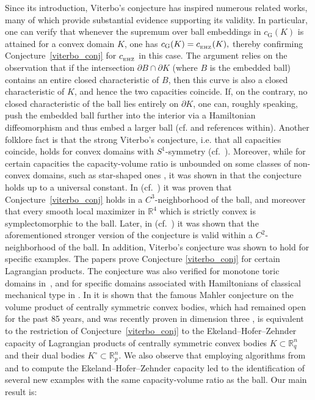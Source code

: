 \documentclass[10pt,a4paper]{article}
\theoremstyle{definition}
\newcommand{\R}{{\mathbb{R}}}
\newcommand{\ehzcap}{c_{_{\rm EHZ}}}
\begin{document}
\medskip 
Since its introduction, Viterbo's conjecture has inspired numerous related works, many of which provide substantial evidence supporting its validity.
In particular, one can verify that whenever the supremum over ball embeddings in $c_{\mathrm{G}}(K)$ is attained for a convex domain $K$, one has  $c_{\mathrm{G}}(K) = \ehzcap(K),$ thereby confirming Conjecture~\ref{viterbo_conj} for $\ehzcap$ in this case. 
The argument relies on the observation that if the intersection $\partial B \cap \partial K$ (where $B$ is the embedded ball) contains an entire closed characteristic of $B$, 
 then this curve is also a closed characteristic of 
$K$, and hence
the two capacities coincide. If, on the contrary, no closed characteristic of the ball lies entirely on $\partial K$, one can, roughly speaking, push the embedded ball further into the interior via a Hamiltonian diffeomorphism and thus embed a larger ball (cf. \cite[Theorem 1.2]{fathi22} and references within). 
Another folklore fact is that the strong Viterbo's conjecture, i.e. that all capacities coincide, holds for convex domains with $S^1$-symmetry (cf.~\cite{gutt-hutchings-ramos}).
Moreover, while for certain capacities the capacity-volume ratio is unbounded on some classes of non-convex domains, such as star-shaped ones \cite{hermann}, it was shown in \cite{ArtsteinAvidanOstroverMilman} that the conjecture holds up to a universal constant.
In \cite{abhs} (cf.~\cite{abbondandoloBenedetti}) it was proven that Conjecture~\ref{viterbo_conj} holds
in a $C^3$-neighborhood of the 
ball, and moreover that every smooth local maximizer in $\R^4$ which is strictly convex is symplectomorphic to the ball.  Later, in \cite{edtmair} (cf.~\cite{abbondandolo-benedetti-edtmair}) 
it was shown that the aforementioned stronger version of the conjecture is valid within a 
$C^2$-neighborhood of the ball.
In addition, Viterbo's conjecture was shown to hold for specific examples.
The papers \cite{balitsky, rudolf} prove Conjecture \ref{viterbo_conj} for certain Lagrangian products.
The conjecture was also verified for  monotone toric domains in~\cite{gutt-hutchings-ramos}, and for specific domains associated with Hamiltonians of classical mechanical type in 
\cite{karasev-sharipova}.
In \cite{capacity_mahler} it is shown that the famous Mahler conjecture on the volume product of centrally symmetric convex bodies, which had remained open for the past 85 years, and was recently proven in  dimension three \cite{mahler3dim}, is equivalent to the restriction of Conjecture~\ref{viterbo_conj} to the Ekeland--Hofer--Zehnder capacity of Lagrangian products of centrally symmetric convex bodies $K \subset \R^n_q$ and their dual bodies  $K^\circ \subset \R^n_p$.
We also observe that employing algorithms from \cite{pazit} and \cite{Ch-H} to compute the Ekeland--Hofer--Zehnder capacity led to the identification of several new examples with the same capacity-volume ratio as the ball.
Our main result is:
\end{document}
